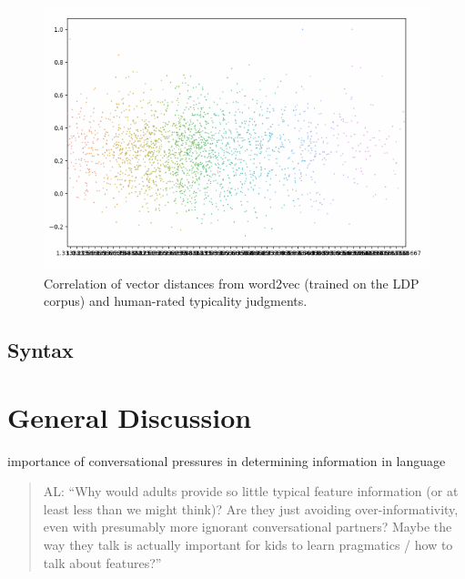 \documentclass[10pt, letterpaper]{article}
\newenvironment{CodeChunk}{}{}
\begin{document}
\begin{CodeChunk}
\begin{figure}[tb]

{\centering \includegraphics{figs/word2vec-1} 

}

\caption[Correlation of vector distances from word2vec (trained on the LDP corpus) and human-rated typicality judgments]{Correlation of vector distances from word2vec (trained on the LDP corpus) and human-rated typicality judgments.}\label{fig:word2vec}
\end{figure}
\end{CodeChunk}

\hypertarget{syntax}{%
\subsection{Syntax}\label{syntax}}

\hypertarget{general-discussion}{%
\section{General Discussion}\label{general-discussion}}

importance of conversational pressures in determining information in
language

\begin{quote}
AL: ``Why would adults provide so little typical feature information (or
at least less than we might think)? Are they just avoiding
over-informativity, even with presumably more ignorant conversational
partners? Maybe the way they talk is actually important for kids to
learn pragmatics / how to talk about features?''
\end{quote}
\end{document}

